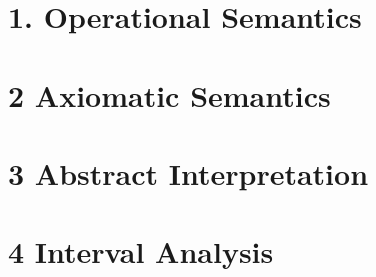 \documentclass[11pt,a4]{article}
\begin{document}
	
\section*{1. Operational Semantics}

\section*{2 Axiomatic Semantics}
\section*{3 Abstract Interpretation}
\section*{4 Interval Analysis}
\end{document}
